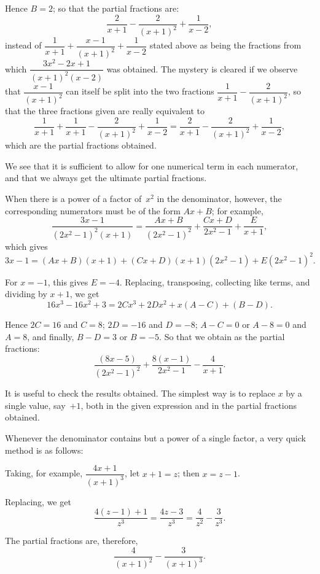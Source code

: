 \documentclass[12pt]{book}[2005/09/16]
\newcommand{\DPPageSep}[2]{\Pagelabel{#2}}
\newcommand{\Pagelabel}[1]
  {\phantomsection\label{#1}}
\begin{document}
Hence $B=2$; so that the partial fractions are:
\[
\frac{2}{x+1} - \frac{2}{(x+1)^2} + \frac{1}{x-2},
\]
instead of $\dfrac{1}{x+1} + \dfrac{x-1}{(x+1)^2} + \dfrac{1}{x-2}$ stated above as being
the fractions from which $\dfrac{3x^2-2x+1}{(x+1)^2(x-2)}$ was obtained.
The mystery is cleared if we observe that $\dfrac{x-1}{(x+1)^2}$ can
itself be split into the two fractions $\dfrac{1}{x+1} - \dfrac{2}{(x+1)^2}$, so
that the three fractions given are really equivalent to
\[
\frac{1}{x+1} + \frac{1}{x+1} - \frac{2}{(x+1)^2} + \frac{1}{x-2}
  = \frac{2}{x+1} - \frac{2}{(x+1)^2} + \frac{1}{x-2},
\]
which are the partial fractions obtained.

We see that it is sufficient to allow for one numerical
term in each numerator, and that we always get the
ultimate partial fractions.

When there is a power of a factor of~$x^2$ in the
denominator, however, the corresponding numerators
must be of the form $Ax+B$; for example,
\[
\frac{3x-1}{(2x^2-1)^2(x+1)}
  = \frac{Ax+B}{(2x^2-1)^2} + \frac{Cx+D}{2x^2-1} + \frac{E}{x+1},
\]
\DPPageSep{141.png}{129}%
which gives
\[%
3x - 1 = (Ax + B)(x + 1)
       + (Cx + D)(x + 1)(2x^2 - 1) + E(2x^2 - 1)^2.
\]

For $x = -1$, this gives $E = -4$. Replacing, transposing,
collecting like terms, and dividing by $x + 1$,
we get
\[
16x^3 - 16x^2 + 3 = 2Cx^3 + 2Dx^2 + x(A - C) + (B - D).
\]

Hence $2C = 16$ and $C = 8$; $2D = -16$ and $D = -8$;
$A - C = 0$ or $A - 8 = 0$ and $A = 8$, and finally, $B - D = 3$
or $B = -5$. So that we obtain as the partial fractions:
\[
\frac{(8x - 5)}{(2x^2 - 1)^2} + \frac{8(x - 1)}{2x^2 - 1} - \frac{4}{x + 1}.
\]

It is useful to check the results obtained. The
simplest way is to replace $x$ by a single value, say~$+1$,
both in the given expression and in the partial
fractions obtained.

Whenever the denominator contains but a power of
a single factor, a very quick method is as follows:

Taking, for example, $\dfrac{4x + 1}{(x + 1)^3}$, let $x + 1 = z$; then
$x = z - 1$.

Replacing, we get
\[
\frac{4(z - 1) + 1}{z^3} = \frac{4z - 3}{z^3} = \frac{4}{z^2} - \frac{3}{z^3}.
\]

The partial fractions are, therefore,
\[
\frac{4}{(x + 1)^2} - \frac{3}{(x + 1)^3}.
\]
\DPPageSep{142.png}{130}%
\end{document}

